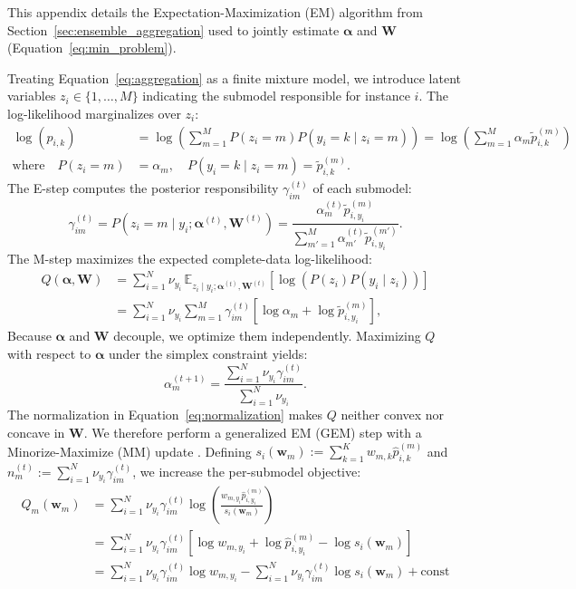 \documentclass[11pt]{elsarticle}
\begin{document}
This appendix details the Expectation-Maximization (EM) algorithm from Section~\ref{sec:ensemble_aggregation} used to jointly estimate $\bm{\alpha}$ and $\bm{W}$ (Equation~\ref{eq:min_problem}).

Treating Equation~\ref{eq:aggregation} as a finite mixture model, we introduce latent variables $z_i \in \{1, \ldots, M\}$ indicating the submodel responsible for instance $i$. The log-likelihood marginalizes over $z_i$:
\begin{align}
\log(\hat{p}_{i,k}) &= \log\left( \sum_{m=1}^M P(z_i = m) P(y_i = k \mid z_i = m) \right) = \log\left( \sum_{m=1}^M \alpha_m \tilde{p}^{(m)}_{i,k} \right) \\
\text{where} \quad P(z_i = m) &= \alpha_m, \quad P(y_i = k \mid z_i = m) = \tilde{p}^{(m)}_{i,k}.
\end{align}
The E-step computes the posterior responsibility $\gamma_{im}^{(t)}$ of each submodel:
\begin{equation}
    \label{eq:responsibility}
\gamma_{im}^{(t)} = P(z_i = m \mid y_i; \bm{\alpha}^{(t)}, \bm{W}^{(t)}) = \frac{\alpha_m^{(t)} \tilde{p}^{(m)}_{i,y_i}}{\sum_{m'=1}^M \alpha_{m'}^{(t)} \tilde{p}^{(m')}_{i,y_i}}.
\end{equation}
The M-step maximizes the expected complete-data log-likelihood:
\begin{align}
Q(\bm{\alpha}, \bm{W}) &= \sum_{i=1}^N \nu_{y_i} \, \mathbb{E}_{z_i \mid y_i; \bm{\alpha}^{(t)}, \bm{W}^{(t)}} \left[ \log \left( P(z_i) P(y_i \mid z_i) \right) \right] \nonumber \\
&= \sum_{i=1}^N \nu_{y_i} \sum_{m=1}^M \gamma_{im}^{(t)} \left[ \log \alpha_m + \log \tilde{p}^{(m)}_{i,y_i} \right], \label{eq:q_function}
\end{align}
Because $\bm{\alpha}$ and $\bm{W}$ decouple, we optimize them independently. Maximizing $Q$ with respect to $\bm{\alpha}$ under the simplex constraint yields:
\begin{equation}
    \label{eq:alpha_update}
\alpha_m^{(t+1)} = \frac{\sum_{i=1}^N \nu_{y_i} \gamma_{im}^{(t)}}{\sum_{i=1}^N \nu_{y_i}}.
\end{equation}
The normalization in Equation~\eqref{eq:normalization} makes $Q$ neither convex nor concave in $\bm{W}$. We therefore perform a generalized EM (GEM) step with a Minorize-Maximize (MM) update \citep{hunterlange2004mm}. Defining $s_i(\bm{w}_m) := \sum_{k=1}^K w_{m,k} \hat{p}^{(m)}_{i,k}$ and $n_m^{(t)} := \sum_{i=1}^N \nu_{y_i} \gamma_{im}^{(t)}$, we increase the per-submodel objective:
\begin{align}
\label{eq:w_update}
Q_m(\bm{w}_m) &= \sum_{i=1}^N \nu_{y_i} \gamma_{im}^{(t)} \log \left( \frac{w_{m,y_i} \hat{p}^{(m)}_{i,y_i}}{s_i(\bm{w}_m)} \right) \\
 &= \sum_{i=1}^N \nu_{y_i} \gamma_{im}^{(t)} \left[ \log w_{m,y_i} + \log \hat{p}^{(m)}_{i,y_i} - \log s_i(\bm{w}_m) \right] \nonumber \\
&= \sum_{i=1}^N \nu_{y_i} \gamma_{im}^{(t)} \log w_{m,y_i} - \sum_{i=1}^N \nu_{y_i} \gamma_{im}^{(t)} \log s_i(\bm{w}_m) + \text{const} \nonumber \\
\end{align}
\end{document}
